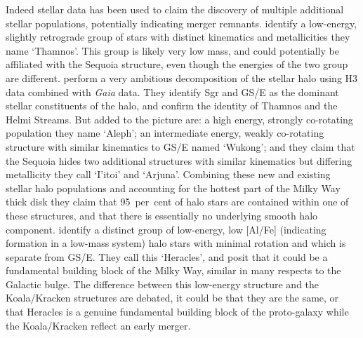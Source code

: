 Indeed stellar data has been used to claim the discovery of multiple additional stellar populations, potentially indicating merger remnants. \textcite{koppelman19b} identify a low-energy, slightly retrograde group of stars with distinct kinematics and metallicities they name `Thamnos'. This group is likely very low mass, and could potentially be affiliated with the Sequoia structure, even though the energies of the two group are different. \textcite{naidu20} perform a very ambitious decomposition of the stellar halo using H3 data combined with \textit{Gaia} data. They identify Sgr and GS/E as the dominant stellar constituents of the halo, and confirm the identity of Thamnos and the Helmi Streams. But added to the picture are: a high energy, strongly co-rotating population they name `Aleph'; an intermediate energy, weakly co-rotating structure with similar kinematics to GS/E named `Wukong'; and they claim that the Sequoia hides two additional structures with similar kinematics but differing metallicity they call `I'itoi' and `Arjuna'. Combining these new and existing stellar halo populations and accounting for the hottest part of the Milky Way thick disk they claim that 95~per~cent of halo stars are contained within one of these structures, and that there is essentially no underlying smooth halo component. \textcite{horta21a} identify a distinct group of low-energy, low [Al/Fe] (indicating formation in a low-mass system) halo stars with minimal rotation and which is separate from GS/E. They call this `Heracles', and posit that it could be a fundamental building block of the Milky Way, similar in many respects to the Galactic bulge. The difference between this low-energy structure and the Koala/Kracken structures are debated, it could be that they are the same, or that Heracles is a genuine fundamental building block of the proto-galaxy while the Koala/Kracken reflect an early merger.

